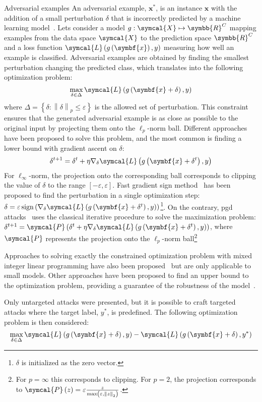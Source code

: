 \documentclass[../main.tex]{subfiles}
\begin{document}
	\begin{mybox}[label={box:adversarial}]{Adversarial examples}
		An adversarial example, \(\symbf{x}^{\ast}\), is an instance \(\symbf{x}\) with the addition of a small perturbation \(\delta\) that is incorrectly predicted by a machine learning model~\cite{Szegedy2013IntriguingPO}.
		Lets consider a model \(g:\symcal{X} \mapsto \symbb{R}^{C} \) mapping examples from the data space \(\symcal{X}\) to the prediction space \(\symbb{R}^{C}\) and a loss function \(\symcal{L}\left(g\left(\symbf{x}\right), y \right)\) measuring how well an example is classified.
		Adversarial examples are obtained by finding the smallest perturbation changing the predicted class, which translates into the following optimization problem:
		\[\max_{\delta \in \Delta} \symcal{L}\left(g\left(\symbf{x}+\delta\right), y \right)\]
		where \(\Delta = \left\{\delta: \left\|\delta\right\|_{p} \leq \varepsilon \right\}\) is the allowed set of perturbation.
		This constraint ensures that the generated adversarial example is as close as possible to the original input by projecting them onto the \(\ell_{p}\)-norm ball.
		Different approaches have been proposed to solve this problem, and the most common is finding a lower bound with gradient ascent on \(\delta\):
		\[\delta^{t+1} = \delta^{t} + \eta \nabla_{\delta}\symcal{L}\left(g\left(\symbf{x}+\delta^{t}\right), y \right)\]
		For \(\ell_{\infty}\)-norm, the projection onto the corresponding ball corresponds to clipping the value of \(\delta\) to the range \(\left[-\varepsilon, \varepsilon\right]\).
		Fast gradient sign method~\cite{FGSM} has been proposed to find the perturbation in a single optimization step: \(\delta = \varepsilon \operatorname{sign}\left(\nabla_{\delta}\symcal{L}\left(g\left(\symbf{x}+\delta^{t}\right), y \right)\right)\)\footnote{\(\delta\) is initialized as the zero vector.}.
		On the contrary, \gls{pgd} attacks~\cite{PGDAttacks,PGDAttacks2} uses the classical iterative procedure to solve the maximization problem: \(\delta^{t+1} = \symcal{P}\left(\delta^{t} + \eta \nabla_{\delta}\symcal{L}\left(g\left(\symbf{x}+\delta^{t}\right), y \right)\right)\), where \(\symcal{P}\) represents the projection onto the \(\ell_{p}\)-norm ball\footnote{For \(p = \infty\) this corresponds to clipping. For \(p =2\), the projection corresponds to \(\symcal{P}\left(z\right) = \varepsilon \frac{z}{\max\left(\varepsilon, \left\|z\right\|_{2}\right)}\).}

		Approaches to solving exactly the constrained optimization problem with mixed integer linear programming have also been proposed~\cite{tjeng2018evaluating} but are only applicable to small models.
		Other approaches have been proposed to find an upper bound to the optimization problem, providing a guarantee of the robustness of the model~\cite{pmlr-v80-wong18a}.

		Only untargeted attacks were presented, but it is possible to craft targeted attacks where the target label, \(y^{\ast}\), is predefined.
		The following optimization problem is then considered:
		\[\max_{\delta \in \Delta} \symcal{L}\left(g\left(\symbf{x}+\delta\right), y \right) - \symcal{L}\left(g\left(\symbf{x}+\delta\right), y^{\ast} \right)\]
	\end{mybox}
\end{document}
